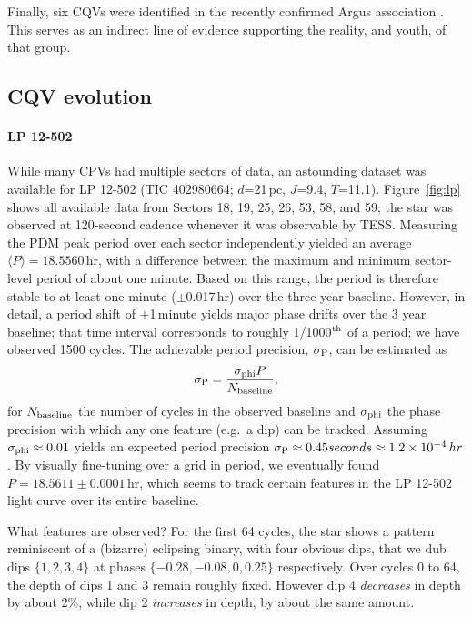 \documentclass[11pt,twocolumn,tighten]{aastex63}
\begin{document}
Finally, six CQVs were identified in the recently confirmed Argus
association \citep{2019ApJ...870...27Z}.  This serves as an indirect
line of evidence supporting the reality, and youth, of that group.


\subsection{CQV evolution}

\paragraph{LP 12-502}
While many CPVs had multiple sectors of data, an astounding dataset
was available for LP 12-502 (TIC 402980664; $d$=21\,pc, $J$=9.4,
$T$=11.1).  Figure~\ref{fig:lp} shows all available data from Sectors
18, 19, 25, 26, 53, 58, and 59; the star was observed at 120-second
cadence whenever it was observable by TESS.
Measuring the PDM peak period over each sector independently yielded
an average $\langle P \rangle = 18.5560$\,hr, with a difference
between the maximum and minimum sector-level period of about one minute.
Based on this range, the period is therefore stable to at least one
minute ($\pm$0.017\,hr) over the three year baseline.
However, in detail, a period shift of $\pm$1\,minute yields major
phase drifts over the 3 year baseline; that time interval
corresponds to roughly 1/1000$^{\rm th}$ of a period; we have
observed 1500 cycles.
The achievable period precision, $\sigma_{\rm P}$, can be estimated as
\begin{equation}
  \sigma_{\rm P} = \frac { \sigma_{\rm phi} P } { N_{\rm baseline} },
\end{equation}
for $N_{\rm baseline}$ the number of cycles in the observed baseline and
$\sigma_{\rm phi}$ the phase precision with which any one feature (e.g.~a
dip) can be tracked.
Assuming $\sigma_{\rm phi} \approx 0.01$ yields an expected period precision
$\sigma_{\rm P} \approx 0.45 seconds \approx 1.2\times 10^{-4}\,hr$.
By visually fine-tuning over a grid in period, we eventually 
found $P=18.5611 \pm 0.0001$\,hr, which seems to track certain
features in the LP 12-502 light curve over its entire baseline.

What features are observed?
For the first 64 cycles, the star shows a pattern reminiscent of a
(bizarre) eclipsing binary, with four obvious dips, that we dub
dips $\{ 1, 2, 3, 4 \}$ at phases $\{ -0.28, -0.08, 0, 0.25 \}$
respectively.  Over cycles 0 to 64, the depth of dips 1 and 3 remain
roughly fixed.  However dip 4 {\it decreases} in depth by about 2\%,
while dip 2 {\it increases} in depth, by about the same amount.
\end{document}
